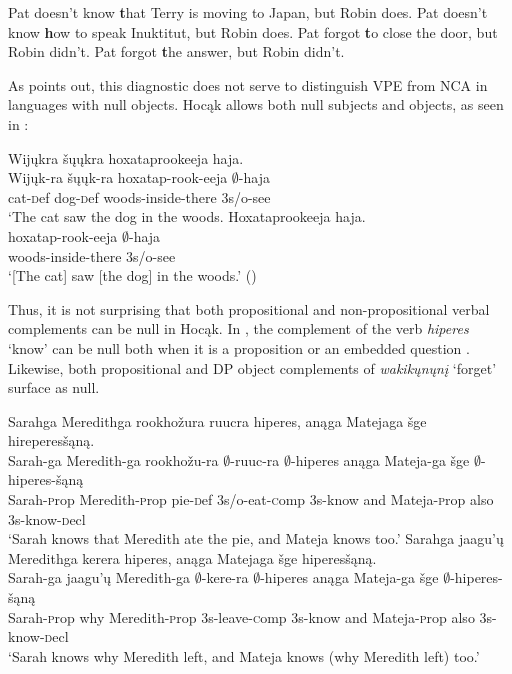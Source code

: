 \documentclass[output=paper]{LSP/langsci}
\begin{document}
\ea\label{ex:johnson:30}
\ea
Pat doesn't know {\textbf that Terry is moving to Japan}, but Robin does.
\ex
Pat doesn't know {\textbf how to speak Inuktitut}, but Robin does.
\ex
Pat forgot {\textbf to close the door}, but Robin didn't.
\ex
Pat forgot {\textbf the answer}, but Robin didn't.
\z
\z

As \citet{Fortin2007} points out, this diagnostic does not serve to distinguish VPE from NCA in languages with null objects. Hocąk allows both null subjects and objects, as seen in :

\ea
\ea
\glll Wijųkra šųųkra hoxataprookeeja haja.\\
Wijųk-ra šųųk-ra hoxatap-rook-eeja $\emptyset$-haja\\
cat-{\textsc def} dog-{\textsc def} woods-inside-there {\textsc 3s/o}-see\\
\trans `The cat saw the dog in the woods.
\ex\label{ex:johnson:31b}
\glll Hoxataprookeeja haja.\\
hoxatap-rook-eeja $\emptyset$-haja\\
woods-inside-there {\textsc 3s/o}-see\\
\trans `[The cat] saw [the dog] in the woods.' (\citealt[7]{JohnsonEtAl2013b})
\z
\z


Thus, it is not surprising that both propositional and non-propositional verbal complements can be null in Hocąk. In , the complement of the verb \emph{hiperes} `know' can be null both when it is a proposition  or an embedded question . Likewise, both propositional  and DP object  complements of \emph{wakikųnųnį} `forget' surface as null.

\ea\label{ex:johnson:32}
\ea\label{ex:johnson:32a}
\glll Sarahga Meredithga rookhožura ruucra hiperes, anąga Matejaga šge hireperesšąną.\\
Sarah-ga Meredith-ga rookhožu-ra $\emptyset$-ruuc-ra $\emptyset$-hiperes anąga Mateja-ga šge $\emptyset$-hiperes-šąną\\
Sarah-{\textsc prop} Meredith-{\textsc prop} pie-{\textsc def} {\textsc 3s/o}-eat-{\textsc comp} {\textsc 3s}-know and Mateja-{\textsc prop} also {\textsc 3s}-know-{\textsc decl}\\
\trans `Sarah knows that Meredith ate the pie, and Mateja knows too.'
\ex\label{ex:johnson:32b}
\glll Sarahga jaagu'ų Meredithga kerera hiperes, anąga Matejaga šge hiperesšąną.\\
Sarah-ga jaagu'ų Meredith-ga $\emptyset$-kere-ra $\emptyset$-hiperes anąga Mateja-ga šge $\emptyset$-hiperes-šąną\\
Sarah-{\textsc prop} why Meredith-{\textsc prop} {\textsc 3s}-leave-{\textsc comp} {\textsc 3s}-know and Mateja-{\textsc prop} also {\textsc 3s}-know-{\textsc decl}\\
\trans `Sarah knows why Meredith left, and Mateja knows (why Meredith left) too.'
\z
\z
\end{document}
